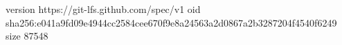 version https://git-lfs.github.com/spec/v1
oid sha256:e041a9fd09e4944cc2584cee670f9e8a24563a2d0867a2b3287204f4540f6249
size 87548
